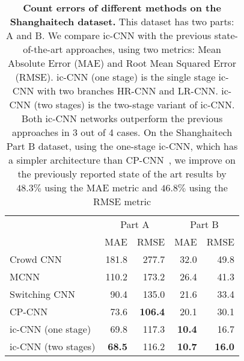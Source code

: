 \documentclass[runningheads]{llncs}
\begin{document}
\setlength{\tabcolsep}{14pt}
\begin{table}[t]
\begin{center}	
\caption{{\bf Count errors of different methods on the Shanghaitech dataset.}  This dataset has two parts: A and B. We compare  ic-CNN with the previous state-of-the-art approaches, using two metrics: Mean Absolute Error (MAE) and Root Mean Squared Error (RMSE). ic-CNN (one stage) is the single stage ic-CNN with two branches HR-CNN and LR-CNN. ic-CNN (two stages) is the two-stage variant of ic-CNN. Both ic-CNN networks outperform the previous approaches in 3 out of 4 cases. On the Shanghaitech Part B dataset, using the one-stage ic-CNN, which has a simpler architecture than CP-CNN~\cite{sindagi2017generating}, we improve on the previously reported state of the art results by  $48.3\%$ using the MAE metric and  $46.8\%$ using the RMSE metric  \label{table_shanghaitech}
}
\begin{tabular}{lrrrr}
\toprule
         & \multicolumn{2}{c}{Part A} & \multicolumn{2}{c}{Part B} \\
         \cmidrule(lr){2-3} \cmidrule(lr){4-5} 
               & MAE          & RMSE         & MAE          & RMSE         \\
\midrule
Crowd CNN~\cite{zhang2015cross}     &        181.8      &  277.7           &   32.0           &  49.8           \\



MCNN~\cite{zhang2016single}           &         110.2     &    173.2         &  26.4            &  41.3           \\
Switching CNN~\cite{sam2017switching}  &   90.4           &  135.0           &     21.6         &     33.4        \\
CP-CNN~\cite{sindagi2017generating}  & 73.6 &\textbf{106.4} &20.1 & 30.1  \\
ic-CNN (one stage) & 69.8&117.3& \textbf{10.4}& 16.7\\
ic-CNN (two stages)  &\textbf{68.5}&116.2& \textbf{10.7}& \textbf{16.0}\\
\bottomrule
\end{tabular}
\end{center}
\end{table}
\end{document}
